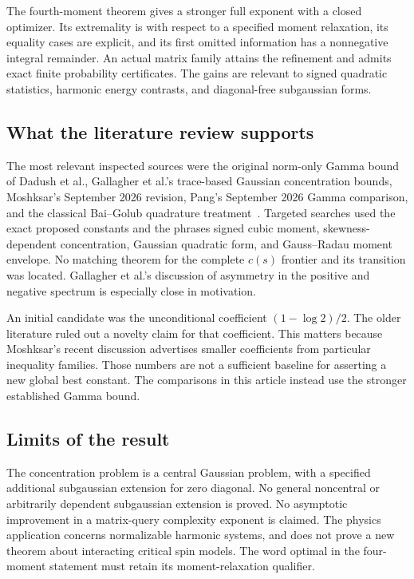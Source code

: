\documentclass[11pt,letterpaper]{article}
\numberwithin{equation}{section}
\theoremstyle{definition}\newtheorem{definition}[theorem]{Definition}
\theoremstyle{remark}\newtheorem{remark}[theorem]{Remark}
\begin{document}
The fourth-moment theorem gives a stronger full exponent with a
closed optimizer. Its extremality is with respect to a specified
moment relaxation, its equality cases are explicit, and its
first omitted information has a nonnegative integral remainder.
An actual matrix family attains the refinement and admits exact
finite probability certificates. The gains are relevant to
signed quadratic statistics, harmonic energy contrasts, and
diagonal-free subgaussian forms.

\subsection{What the literature review supports}
The most relevant inspected sources were the original norm-only
Gamma bound of Dadush et al., Gallagher et al.'s trace-based
Gaussian concentration bounds, Moshksar's September 2026 revision,
Pang's September 2026 Gamma comparison, and the classical
Bai--Golub quadrature treatment~\cite{DGO,Gallagher,Moshksar,Pang,BaiGolub}.
Targeted searches used the exact proposed constants and the
phrases signed cubic moment, skewness-dependent concentration,
Gaussian quadratic form, and Gauss--Radau moment envelope.
No matching theorem for the complete $c(s)$ frontier and its
transition was located. Gallagher et al.'s discussion of
asymmetry in the positive and negative spectrum is especially
close in motivation.

An initial candidate was the unconditional coefficient
$(1-\log2)/2$. The older literature ruled out a novelty claim
for that coefficient. This matters because Moshksar's recent
discussion advertises smaller coefficients from particular
inequality families. Those numbers are not a sufficient baseline
for asserting a new global best constant. The comparisons in this
article instead use the stronger established Gamma bound.

\subsection{Limits of the result}
The concentration problem is a central Gaussian problem, with a
specified additional subgaussian extension for zero diagonal.
No general noncentral or arbitrarily dependent subgaussian
extension is proved. No asymptotic improvement in a matrix-query
complexity exponent is claimed. The physics application concerns
normalizable harmonic systems, and does not prove a new theorem
about interacting critical spin models. The word optimal in the
four-moment statement must retain its moment-relaxation qualifier.
\end{document}
